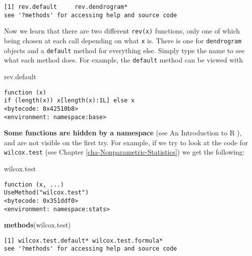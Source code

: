 \documentclass[]{book}
\newenvironment{Shaded}{\begin{snugshade}}{\end{snugshade}}
\newcommand{\KeywordTok}[1]{\textcolor[rgb]{0.13,0.29,0.53}{\textbf{{#1}}}}
\newcommand{\NormalTok}[1]{{#1}}
\numberwithin{equation}{chapter}
\numberwithin{figure}{chapter}
\theoremstyle{plain}
\theoremstyle{definition}
\theoremstyle{remark}
\theoremstyle{definition}
\theoremstyle{definition}
\theoremstyle{remark}
\begin{document}
\begin{verbatim}
[1] rev.default     rev.dendrogram*
see '?methods' for accessing help and source code
\end{verbatim}

Now we learn that there are two different \texttt{rev(x)} functions,
only one of which being chosen at each call depending on what \texttt{x}
is. There is one for \texttt{dendrogram} objects and a \texttt{default}
method for everything else. Simply type the name to see what each method
does. For example, the \texttt{default} method can be viewed with

\begin{Shaded}
\begin{Highlighting}[]
\NormalTok{rev.default}
\end{Highlighting}
\end{Shaded}

\begin{verbatim}
function (x) 
if (length(x)) x[length(x):1L] else x
<bytecode: 0x42510b8>
<environment: namespace:base>
\end{verbatim}

\textbf{Some functions are hidden by a namespace} (see An Introduction
to R \textcite{Venables2010}), and are not visible on the first try. For
example, if we try to look at the code for \texttt{wilcox.test}
 (see Chapter
\ref{cha-Nonparametric-Statistics}) we get the following:

\begin{Shaded}
\begin{Highlighting}[]
\NormalTok{wilcox.test}
\end{Highlighting}
\end{Shaded}

\begin{verbatim}
function (x, ...) 
UseMethod("wilcox.test")
<bytecode: 0x351ddf0>
<environment: namespace:stats>
\end{verbatim}

\begin{Shaded}
\begin{Highlighting}[]
\KeywordTok{methods}\NormalTok{(wilcox.test)}
\end{Highlighting}
\end{Shaded}

\begin{verbatim}
[1] wilcox.test.default* wilcox.test.formula*
see '?methods' for accessing help and source code
\end{verbatim}
\end{document}
